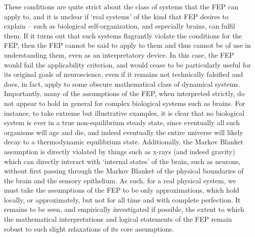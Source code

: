These conditions are quite strict about the class of systems that the FEP can apply to, and it is unclear if `real systems' of the kind that FEP desires to explain -- such as biological self-organization, and especially brains, can fulfil them. If it turns out that such systems flagrantly violate the conditions for the FEP, then the FEP cannot be said to apply to them and thus cannot be of use in understanding them, even as an interpretatory device. In this case, the FEP would fail the applicability criterion, and would cease to be particularly useful for its original goals of neuroscience, even if it remains not technically falsified and does, in fact, apply to some obscure mathematical class of dynamical systems. Importantly, many of the assumptions of the FEP, when interpreted strictly, do not appear to hold in general for complex biological systems such as brains. For instance, to take extreme but illustrative examples, it is clear that no biological system is ever in a true non-equilibrium steady state, since eventually all such organisms will age and die, and indeed eventually the entire universe will likely decay to a thermodynamic equilibrium state. Additionally, the Markov Blanket assumption is directly violated by things such as x-rays (and indeed gravity) which can directly interact with `internal states' of the brain, such as neurons, without first passing through the Markov Blanket of the physical boundaries of the brain and the sensory epithelium. As such, for a real physical system, we must take the assumptions of the FEP to be only approximations, which hold locally, or approximately, but not for all time and with complete perfection. It remains to be seen, and empirically investigated if possible, the extent to which the mathematical interpretations and logical statements of the FEP remain robust to such slight relaxations of its core assumptions.

